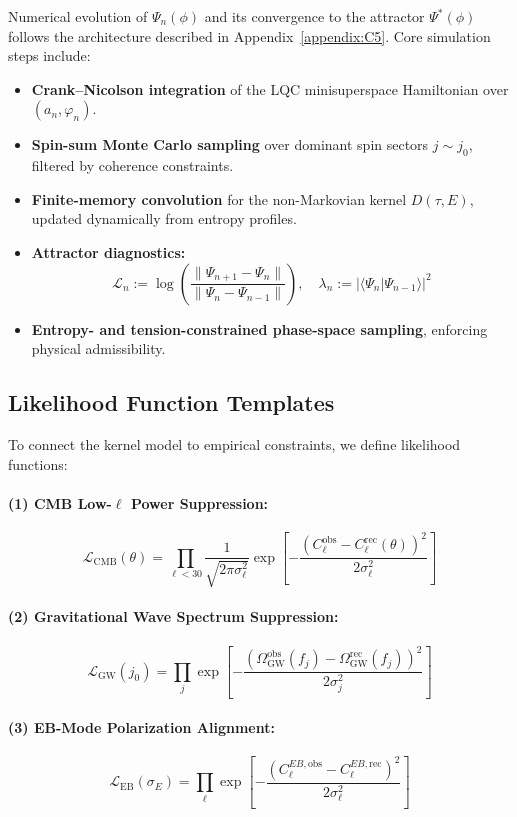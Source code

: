 Numerical evolution of \( \Psi_n(\phi) \) and its convergence to the attractor \( \Psi^*(\phi) \) follows the architecture described in Appendix~\ref{appendix:C5}. Core simulation steps include:

\begin{itemize}
    \item \textbf{Crank–Nicolson integration} of the LQC minisuperspace Hamiltonian over \( (a_n, \varphi_n) \).
    \item \textbf{Spin-sum Monte Carlo sampling} over dominant spin sectors \( j \sim j_0 \), filtered by coherence constraints.
    \item \textbf{Finite-memory convolution} for the non-Markovian kernel \( D(\tau, E) \), updated dynamically from entropy profiles.
    \item \textbf{Attractor diagnostics:}
    \[
    \mathcal{L}_n := \log \left( \frac{\|\Psi_{n+1} - \Psi_n\|}{\|\Psi_n - \Psi_{n-1}\|} \right), \quad \lambda_n := |\langle \Psi_n | \Psi_{n-1} \rangle|^2
    \]
    \item \textbf{Entropy- and tension-constrained phase-space sampling}, enforcing physical admissibility.
\end{itemize}

\subsection{Likelihood Function Templates}

To connect the kernel model to empirical constraints, we define likelihood functions:

\paragraph{(1) CMB Low-\( \ell \) Power Suppression:}
\[
\mathcal{L}_{\text{CMB}}(\theta) = \prod_{\ell < 30} \frac{1}{\sqrt{2\pi \sigma_\ell^2}} \exp\left[ -\frac{(C_\ell^{\text{obs}} - C_\ell^{\text{rec}}(\theta))^2}{2\sigma_\ell^2} \right]
\]

\paragraph{(2) Gravitational Wave Spectrum Suppression:}
\[
\mathcal{L}_{\text{GW}}(j_0) = \prod_j \exp\left[ -\frac{(\Omega_{\text{GW}}^{\text{obs}}(f_j) - \Omega_{\text{GW}}^{\text{rec}}(f_j))^2}{2\sigma_j^2} \right]
\]

\paragraph{(3) EB-Mode Polarization Alignment:}
\[
\mathcal{L}_{\text{EB}}(\sigma_E) = \prod_\ell \exp\left[ -\frac{(C_\ell^{EB,\text{obs}} - C_\ell^{EB,\text{rec}})^2}{2\sigma_\ell^2} \right]
\]

